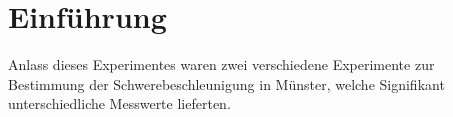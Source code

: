 \section{Einführung}
Anlass dieses Experimentes waren zwei verschiedene Experimente zur Bestimmung der Schwerebeschleunigung in Münster, welche Signifikant unterschiedliche Messwerte lieferten.
